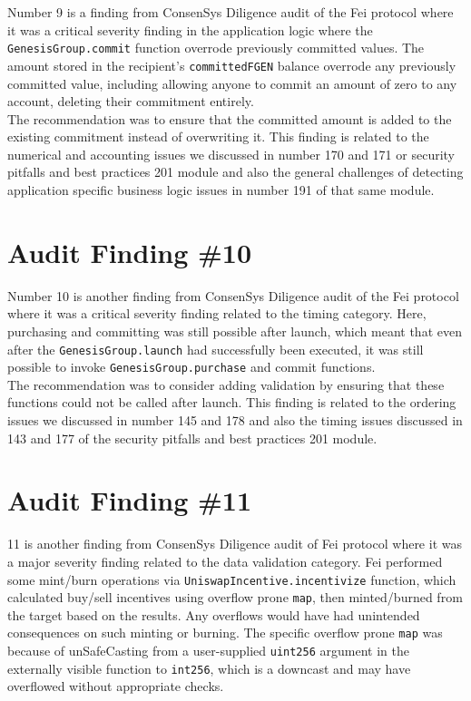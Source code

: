 Number 9 is a finding from ConsenSys Diligence audit of the Fei protocol where it was a critical severity finding in the application logic where the \verb|GenesisGroup.commit| function overrode previously committed values. The amount stored in the recipient's \verb|committedFGEN| balance overrode any previously committed value, including allowing anyone to commit an amount of zero to any account, deleting their commitment entirely.\\

The recommendation was to ensure that the committed amount is added to the existing commitment instead of overwriting it. This finding is related to the numerical and accounting issues we discussed in number 170 and 171 or security pitfalls and best practices 201 module and also the general challenges of detecting application specific business logic issues in number 191 of that same module.

\section{Audit Finding \#10}

Number 10 is another finding from ConsenSys Diligence audit of the Fei protocol where it was a critical severity finding related to the timing category. Here, purchasing and committing was still possible after launch, which meant that even after the \verb|GenesisGroup.launch| had successfully been executed, it was still possible to invoke \verb|GenesisGroup.purchase| and commit functions.\\

The recommendation was to consider adding validation by ensuring that these functions could not be called after launch. This finding is related to the ordering issues we discussed in number 145 and 178 and also the timing issues discussed in 143 and 177 of the security pitfalls and best practices 201 module.

\section{Audit Finding \#11}

11 is another finding from ConsenSys Diligence audit of Fei protocol where it was a major severity finding related to the data validation category. Fei performed some mint/burn operations via \verb|UniswapIncentive.incentivize| function, which calculated buy/sell incentives using overflow prone \verb|map|, then minted/burned from the target based on the results. Any overflows would have had unintended consequences on such minting or burning. The specific overflow prone \verb|map| was because of unSafeCasting from a user-supplied \verb|uint256| argument in the externally visible function to \verb|int256|, which is a downcast and may have overflowed without appropriate checks.\\

